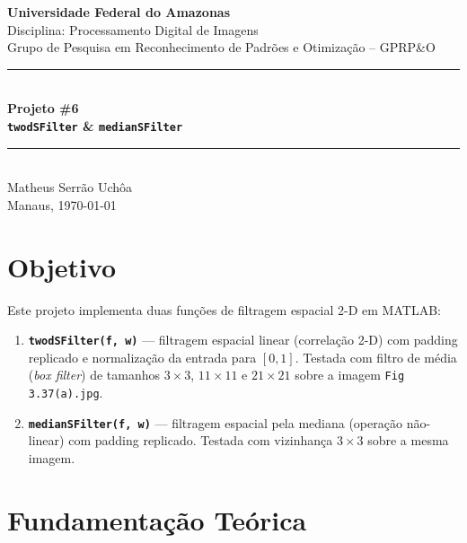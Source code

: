 \documentclass[12pt,a4paper]{article}
\begin{document}

\begin{center}
  {\Large\bfseries Universidade Federal do Amazonas}\\[4pt]
  {\large Disciplina: Processamento Digital de Imagens}\\[2pt]
  {\large Grupo de Pesquisa em Reconhecimento de Padrões e Otimização -- GPRP\&O}\\[12pt]
  \rule{\linewidth}{1.5pt}\\[6pt]
  {\LARGE\bfseries Projeto \#6}\\[4pt]
  {\Large\bfseries \texttt{twodSFilter} \& \texttt{medianSFilter}}\\[6pt]
  \rule{\linewidth}{1.5pt}\\[10pt]
  {\large Matheus Serr\~ao Uch\^oa}\\[2pt]
  {\normalsize Manaus, \today}
\end{center}

\vspace{4mm}

\section{Objetivo}

Este projeto implementa duas funções de filtragem espacial 2-D em MATLAB:

\begin{enumerate}
  \item \textbf{\texttt{twodSFilter(f, w)}} — filtragem espacial linear
        (correlação 2-D) com padding replicado e normalização da entrada para
        $[0,1]$. Testada com filtro de média (\emph{box filter}) de tamanhos
        $3\times3$, $11\times11$ e $21\times21$ sobre a imagem
        \texttt{Fig\,3.37(a).jpg}.

  \item \textbf{\texttt{medianSFilter(f, w)}} — filtragem espacial pela
        mediana (operação não-linear) com padding replicado. Testada com
        vizinhança $3\times3$ sobre a mesma imagem.
\end{enumerate}

\section{Fundamentação Teórica}
\end{document}
